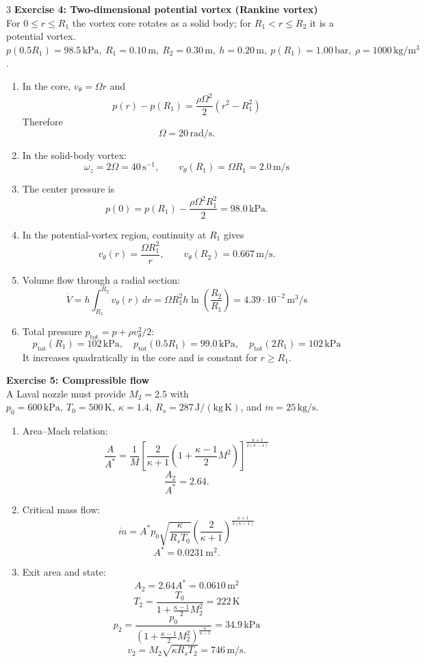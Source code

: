 \documentclass[9pt, landscape, a4paper]{article}
\begin{document}
\begin{multicols*}{3}
\textbf{Exercise 4: Two-dimensional potential vortex (Rankine vortex)}\\
For $0\leq r\leq R_1$ the vortex core rotates as a solid body; for
$R_1<r\leq R_2$ it is a potential vortex.\\
$p(0.5R_1)=98.5\,\mathrm{kPa},\ R_1=0.10\,\mathrm{m},\
R_2=0.30\,\mathrm{m},\ h=0.20\,\mathrm{m},\
p(R_1)=1.00\,\mathrm{bar},\ \rho=1000\,\mathrm{kg/m^3}$.
\begin{enumerate}[label=(\alph*)]
  \item In the core, $v_\theta=\Omega r$ and
    \[
      p(r)-p(R_1)=\frac{\rho\Omega^2}{2}(r^2-R_1^2)
    \]
    Therefore
    \[
      \Omega=20\,\mathrm{rad/s}.
    \]
  \item In the solid-body vortex:
    \[
      \omega_z=2\Omega=40\,\mathrm{s^{-1}},\qquad
      v_\theta(R_1)=\Omega R_1=2.0\,\mathrm{m/s}
    \]
  \item The center pressure is
    \[
      p(0)=p(R_1)-\frac{\rho\Omega^2R_1^2}{2}
      =98.0\,\mathrm{kPa}.
    \]
  \item In the potential-vortex region, continuity at $R_1$ gives
    \[
      v_\theta(r)=\frac{\Omega R_1^2}{r},\qquad
      v_\theta(R_2)=0.667\,\mathrm{m/s}.
    \]
  \item Volume flow through a radial section:
    \[
      \dot V=h\int_{R_1}^{R_2}v_\theta(r)\,dr
      =\Omega R_1^2h\ln\left(\frac{R_2}{R_1}\right)
      =4.39\cdot10^{-2}\,\mathrm{m^3/s}
    \]
  \item Total pressure $p_\mathrm{tot}=p+\rho v_\theta^2/2$:
    \[
      p_\mathrm{tot}(R_1)=102\,\mathrm{kPa},\quad
      p_\mathrm{tot}(0.5R_1)=99.0\,\mathrm{kPa},\quad
      p_\mathrm{tot}(2R_1)=102\,\mathrm{kPa}
    \]
    It increases quadratically in the core and is constant for
    $r\geq R_1$.
\end{enumerate}

\textbf{Exercise 5: Compressible flow}\\
A Laval nozzle must provide $M_2=2.5$ with
$p_0=600\,\mathrm{kPa},\ T_0=500\,\mathrm{K},\
\kappa=1.4,\ R_s=287\,\mathrm{J/(kg\,K)}$, and
$\dot m=25\,\mathrm{kg/s}$.
\begin{enumerate}[label=(\alph*)]
  \item Area--Mach relation:
    \[
      \frac{A}{A^*}=\frac{1}{M}
      \left[\frac{2}{\kappa+1}
      \left(1+\frac{\kappa-1}{2}M^2\right)\right]^{
      \frac{\kappa+1}{2(\kappa-1)}}
    \]
    \[
      \frac{A_2}{A^*}=2.64.
    \]
  \item Critical mass flow:
    \[
      \dot m=A^*p_0\sqrt{\frac{\kappa}{R_sT_0}}
      \left(\frac{2}{\kappa+1}\right)^{
      \frac{\kappa+1}{2(\kappa-1)}}
    \]
    \[
      A^*=0.0231\,\mathrm{m^2}.
    \]
  \item Exit area and state:
    \[
      A_2=2.64A^*=0.0610\,\mathrm{m^2}
    \]
    \[
      T_2=\frac{T_0}{1+\frac{\kappa-1}{2}M_2^2}
      =222\,\mathrm{K}
    \]
    \[
      p_2=\frac{p_0}{
      \left(1+\frac{\kappa-1}{2}M_2^2\right)^{
      \frac{\kappa}{\kappa-1}}}
      =34.9\,\mathrm{kPa}
    \]
    \[
      v_2=M_2\sqrt{\kappa R_sT_2}=746\,\mathrm{m/s}.
    \]
\end{enumerate}


\end{multicols*}
\end{document}
